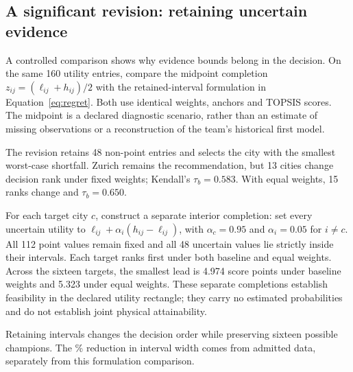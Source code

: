 \subsection{A significant revision: retaining uncertain evidence}
A controlled comparison shows why evidence bounds belong in the decision.
On the same 160 utility entries, compare the midpoint completion $z_{ij}=(\ell_{ij}+h_{ij})/2$ with the retained-interval formulation in Equation~\ref{eq:regret}. Both use identical weights, anchors and TOPSIS scores. The midpoint is a declared diagnostic scenario, rather than an estimate of missing observations or a reconstruction of the team's historical first model.

The revision retains 48 non-point entries and selects the city with the smallest worst-case shortfall. Zurich remains the recommendation, but 13 cities change decision rank under fixed weights; Kendall's $\tau_b=0.583$. With equal weights, 15 ranks change and $\tau_b=0.650$.

For each target city $c$, construct a separate interior completion: set every uncertain utility to $\ell_{ij}+\alpha_i(h_{ij}-\ell_{ij})$, with $\alpha_c=0.95$ and $\alpha_i=0.05$ for $i\ne c$. All 112 point values remain fixed and all 48 uncertain values lie strictly inside their intervals. Each target ranks first under both baseline and equal weights. Across the sixteen targets, the smallest lead is 4.974 score points under baseline weights and 5.323 under equal weights. These separate completions establish feasibility in the declared utility rectangle; they carry no estimated probabilities and do not establish joint physical attainability.

Retaining intervals changes the decision order while preserving sixteen possible champions. The \TotalWidthReduction\% reduction in interval width comes from admitted data, separately from this formulation comparison.
